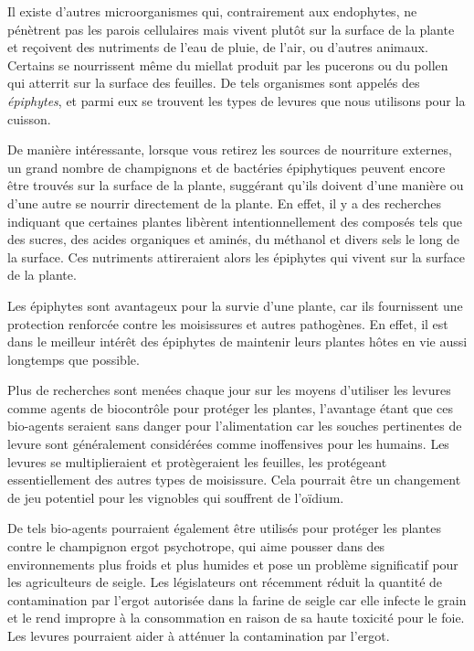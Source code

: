 Il existe d'autres microorganismes qui, contrairement aux endophytes, ne pénètrent pas les parois cellulaires mais vivent plutôt sur la surface de la plante et reçoivent des nutriments de l'eau de pluie, de l'air, ou d'autres animaux. Certains se nourrissent même du miellat produit par les pucerons ou du pollen qui atterrit sur la surface des feuilles. De tels organismes sont appelés des \emph{épiphytes}, et parmi eux se trouvent les types de levures que nous utilisons pour la cuisson.

De manière intéressante, lorsque vous retirez les sources de nourriture externes, un grand nombre de champignons et de bactéries épiphytiques peuvent encore être trouvés sur la surface de la plante, suggérant qu'ils doivent d'une manière ou d'une autre se nourrir directement de la plante. En effet, il y a des recherches indiquant que certaines plantes libèrent intentionnellement des composés tels que des sucres, des acides organiques et aminés, du méthanol et divers sels le long de la surface. Ces nutriments attireraient alors les épiphytes qui vivent sur la surface de la plante.

Les épiphytes sont avantageux pour la survie d'une plante, car ils fournissent une protection renforcée contre les moisissures et autres pathogènes. En effet, il est dans le meilleur intérêt des épiphytes de maintenir leurs plantes hôtes en vie aussi longtemps que possible.

Plus de recherches sont menées chaque jour sur les moyens d'utiliser les levures comme agents de biocontrôle pour protéger les plantes, l'avantage étant que ces bio-agents seraient sans danger pour l'alimentation car les souches pertinentes de levure sont généralement considérées comme inoffensives pour les humains. Les levures se multiplieraient et protègeraient les feuilles, les protégeant essentiellement des autres types de moisissure. Cela pourrait être un changement de jeu potentiel pour les vignobles qui souffrent de l'oïdium.

De tels bio-agents pourraient également être utilisés pour protéger les plantes contre le champignon ergot psychotrope, qui aime pousser dans des environnements plus froids et plus humides et pose un problème significatif pour les agriculteurs de seigle. Les législateurs ont récemment réduit la quantité de contamination par l'ergot autorisée dans la farine de seigle car elle infecte le grain et le rend impropre à la consommation en raison de sa haute toxicité pour le foie. Les levures pourraient aider à atténuer la contamination par l'ergot.

